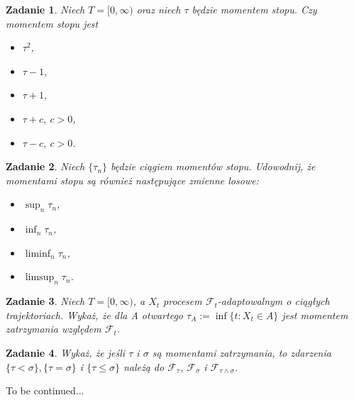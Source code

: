 \documentclass{mwart}
\newtheorem{zd}{Zadanie}
\begin{document}
\begin{zd}
Niech $T= [0, \infty)$ oraz niech $\tau$ będzie momentem stopu. Czy momentem stopu jest
\begin{itemize}
\item $\tau^2$,
\item $\tau -1$,
\item $\tau +1$,
\item $\tau + c,\ c>0$,
\item $\tau - c,\ c>0$.
\end{itemize}
\end{zd}

\begin{zd}
	Niech $\{\tau_n\}$ będzie ciągiem momentów stopu. Udowodnij, że momentami stopu są również następujące zmienne losowe:
	\begin{itemize}
		\item $\sup_n\tau_n$,
		\item $\inf_n \tau_n$,
		\item $\liminf_n \tau_n$,
		\item $\limsup_n \tau_n$.
	\end{itemize}
\end{zd}

\begin{zd}
Niech $T=[0,\infty)$, a $X_{{t}}$ procesem ${\mathcal{F}}_{{t}}$-adaptowalnym o ciągłych trajektoriach. Wykaż, że dla A otwartego $\tau _{{A}}:=\inf\{ t\colon X_{{t}}\in A\}$ jest momentem zatrzymania względem ${\mathcal{F}}_{{t}}$.
\end{zd}

\begin{zd}
Wykaż, że jeśli $\tau$ i $\sigma$ są momentami zatrzymania, to zdarzenia $\{\tau<\sigma\},\{\tau=\sigma\}$ i $\{\tau\leq\sigma\}$ należą do ${\mathcal{F}}_{{\tau}}$, ${\mathcal{F}}_{{\sigma}}$ i ${\mathcal{F}}_{{\tau\wedge\sigma}}$.
\end{zd}


\begin{flushright}
To be continued...
\end{flushright}
\end{document}
